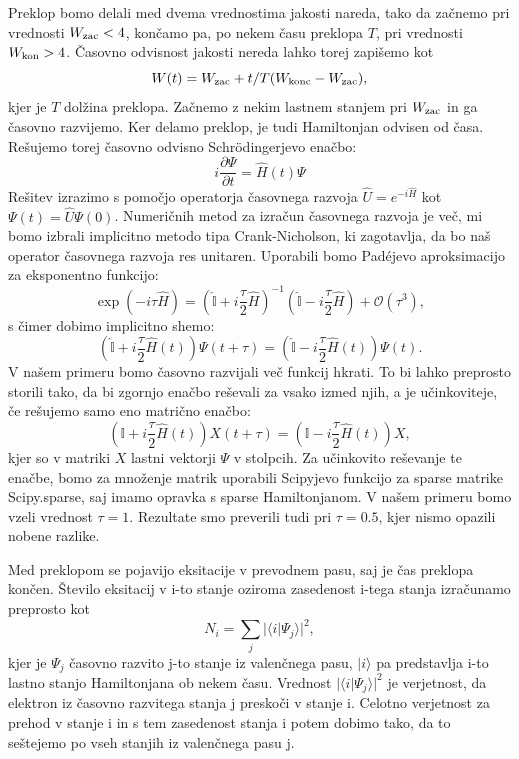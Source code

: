 Preklop bomo delali med dvema vrednostima jakosti nareda, tako da začnemo pri vrednosti $W_{\textup{zac}}<4$, končamo pa, po nekem času preklopa $T$, pri vrednosti $W_{\textup{kon}}>4$.
Časovno odvisnost jakosti nereda lahko torej zapišemo kot 
\begin{equation}
W(t) = W_{\textup{zac}} +  t/T (W_{\textup{konc}}-W_{\textup{zac}}),
\end{equation}
kjer je $T$ dolžina preklopa. 
Začnemo z nekim lastnem stanjem pri $W_{\textup{zac}}$ in ga časovno razvijemo. Ker delamo preklop, je tudi Hamiltonjan odvisen od časa.
Rešujemo torej časovno odvisno Schrödingerjevo enačbo:
\begin{equation}
i \frac{\partial \Psi}{\partial t} = \hat{H}(t) \Psi
\end{equation}
Rešitev izrazimo s pomočjo operatorja časovnega razvoja $\hat{U} = e^{-i \hat{H}}$ kot $\Psi(t) = \hat{U} \Psi(0)$.
Numeričnih metod za izračun časovnega razvoja je več, mi bomo izbrali implicitno metodo tipa Crank-Nicholson, ki zagotavlja, da bo naš operator časovnega razvoja res unitaren.
Uporabili bomo Padéjevo aproksimacijo za eksponentno funkcijo:
\begin{equation}
\exp (-i \tau \hat{H}) = \left(\hat{\mathbb{I}} + i \frac{\tau}{2} \hat{H} \right)^{-1}   \left(\hat{\mathbb{I}} - i \frac{\tau}{2} \hat{H} \right) + \mathcal{O}(\tau^3),
\end{equation} 
s čimer dobimo implicitno shemo:
\begin{equation}
\left( \hat{\mathbb{I}} + i \frac{\tau}{2} \hat{H}(t) \right) \Psi (t+\tau) = \left(\hat{\mathbb{I}}- i \frac{\tau}{2} \hat{H}(t) \right) \Psi(t).
\end{equation}
V našem primeru bomo časovno razvijali več funkcij hkrati. To bi lahko preprosto storili tako, da bi zgornjo enačbo reševali za vsako izmed njih, a je učinkoviteje, če rešujemo samo eno matrično enačbo:
\begin{equation}
\left( \mathbb{I} + i \frac{\tau}{2} \hat{H}(t) \right) X(t+\tau) = \left(\mathbb{I}- i \frac{\tau}{2} \hat{H}(t) \right) X,
\end{equation}
kjer so v matriki $X$ lastni vektorji $\Psi$ v stolpcih.
Za učinkovito reševanje te enačbe, bomo za množenje matrik uporabili Scipyjevo funkcijo za sparse matrike Scipy.sparse, saj imamo opravka s sparse Hamiltonjanom.
V našem primeru bomo vzeli vrednost $\tau=1$. Rezultate smo preverili tudi pri $\tau=0.5$, kjer nismo opazili nobene razlike.

Med preklopom se pojavijo eksitacije v prevodnem pasu, saj je čas preklopa končen.
Število eksitacij v i-to stanje oziroma zasedenost i-tega stanja izračunamo preprosto kot
\begin{equation}
N_i = \sum_j |\langle i | \Psi_j \rangle|^2,
\end{equation}
kjer je $\Psi_j$ časovno razvito j-to stanje iz valenčnega pasu, $| i \rangle$ pa predstavlja i-to lastno stanjo Hamiltonjana ob nekem času. Vrednost $| \langle i | \Psi_j \rangle |^2$ je verjetnost, da elektron iz časovno razvitega stanja j preskoči v stanje i. Celotno verjetnost za prehod v stanje i in s tem zasedenost stanja i potem dobimo tako, da to seštejemo po vseh stanjih iz valenčnega pasu j.

